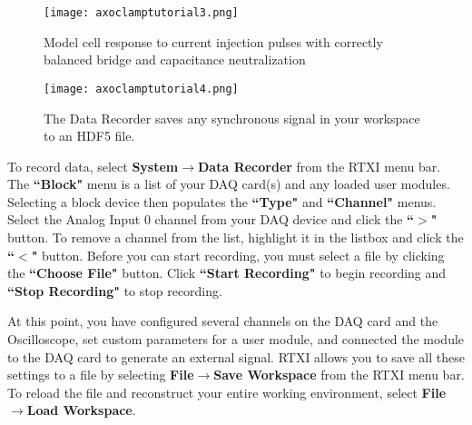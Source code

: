 \begin{figure}[h!]
\begin{maxipage}
\begin{center}
\texttt{[image: axoclamptutorial3.png]} 
\caption[Axoclamp Tutorial: Balanced Bridge]{Model cell response to current injection pulses with correctly balanced bridge and capacitance neutralization}
\label{fig:balancedbridge}
\end{center}
\end{maxipage}
\end{figure}

\begin{figure}[h!]
\begin{maxipage}
\begin{center}
\texttt{[image: axoclamptutorial4.png]} 
\caption[Data Recorder]{The Data Recorder saves any synchronous signal in your workspace to an HDF5 file.} 
\end{center}
\end{maxipage}
\end{figure}

To record data, select \textbf{System}$\rightarrow$\textbf{Data Recorder} from the RTXI menu bar. The \textbf{``Block"} menu is a list of your DAQ card(s) and any loaded user modules. Selecting a block device then populates the \textbf{``Type"} and \textbf{``Channel"} menus. Select the Analog Input 0 channel from your DAQ device and click the \textbf{``$>$"} button. To remove a channel from the list, highlight it in the listbox and click the \textbf{``$<$"} button. Before you can start recording, you must select a file by clicking the \textbf{``Choose File"} button. Click \textbf{``Start Recording"} to begin recording and \textbf{``Stop Recording"} to stop recording.

\vspace{1cm}
At this point, you have configured several channels on the DAQ card and the Oscilloscope, set custom parameters for a user module, and connected the module to the DAQ card to generate an external signal. RTXI allows you to save all these settings to a file by selecting \textbf{File}$\rightarrow$\textbf{Save Workspace} from the RTXI menu bar. To reload the file and reconstruct your entire working environment, select   \textbf{File}$\rightarrow$\textbf{Load Workspace}.